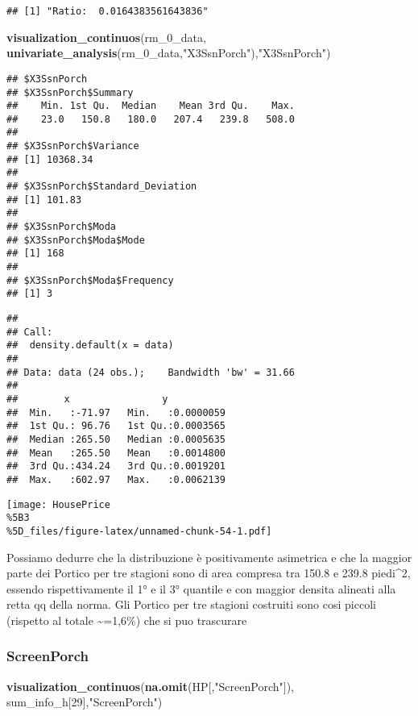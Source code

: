 \documentclass[
]{article}
\newenvironment{Shaded}{\begin{snugshade}}{\end{snugshade}}
\newcommand{\DecValTok}[1]{\textcolor[rgb]{0.00,0.00,0.81}{#1}}
\newcommand{\FunctionTok}[1]{\textcolor[rgb]{0.13,0.29,0.53}{\textbf{#1}}}
\newcommand{\NormalTok}[1]{#1}
\newcommand{\StringTok}[1]{\textcolor[rgb]{0.31,0.60,0.02}{#1}}
\begin{document}
\begin{verbatim}
## [1] "Ratio:  0.0164383561643836"
\end{verbatim}

\begin{Shaded}
\begin{Highlighting}[]
\FunctionTok{visualization\_continuos}\NormalTok{(rm\_0\_data, }\FunctionTok{univariate\_analysis}\NormalTok{(rm\_0\_data,}\StringTok{"X3SsnPorch"}\NormalTok{),}\StringTok{"X3SsnPorch"}\NormalTok{)}
\end{Highlighting}
\end{Shaded}

\begin{verbatim}
## $X3SsnPorch
## $X3SsnPorch$Summary
##    Min. 1st Qu.  Median    Mean 3rd Qu.    Max. 
##    23.0   150.8   180.0   207.4   239.8   508.0 
## 
## $X3SsnPorch$Variance
## [1] 10368.34
## 
## $X3SsnPorch$Standard_Deviation
## [1] 101.83
## 
## $X3SsnPorch$Moda
## $X3SsnPorch$Moda$Mode
## [1] 168
## 
## $X3SsnPorch$Moda$Frequency
## [1] 3
\end{verbatim}

\begin{verbatim}
## 
## Call:
##  density.default(x = data)
## 
## Data: data (24 obs.);    Bandwidth 'bw' = 31.66
## 
##        x                y            
##  Min.   :-71.97   Min.   :0.0000059  
##  1st Qu.: 96.76   1st Qu.:0.0003565  
##  Median :265.50   Median :0.0005635  
##  Mean   :265.50   Mean   :0.0014800  
##  3rd Qu.:434.24   3rd Qu.:0.0019201  
##  Max.   :602.97   Max.   :0.0062139
\end{verbatim}

\texttt{[image: HousePrice\\\%5B3\\\%5D\_files/figure-latex/unnamed-chunk-54-1.pdf]}

Possiamo dedurre che la distribuzione è positivamente asimetrica e che
la maggior parte dei Portico per tre stagioni sono di area compresa tra
150.8 e 239.8 piedi\^{}2, essendo rispettivamente il 1° e il 3° quantile
e con maggior densita alineati alla retta qq della norma. Gli Portico
per tre stagioni costruiti sono cosi piccoli (rispetto al totale
\textasciitilde=1,6\%) che si puo trascurare

\subsubsection{ScreenPorch}\label{screenporch}

\begin{Shaded}
\begin{Highlighting}[]
\FunctionTok{visualization\_continuos}\NormalTok{(}\FunctionTok{na.omit}\NormalTok{(HP[,}\StringTok{"ScreenPorch"}\NormalTok{]), sum\_info\_h[}\DecValTok{29}\NormalTok{],}\StringTok{"ScreenPorch"}\NormalTok{)}
\end{Highlighting}
\end{Shaded}
\end{document}
